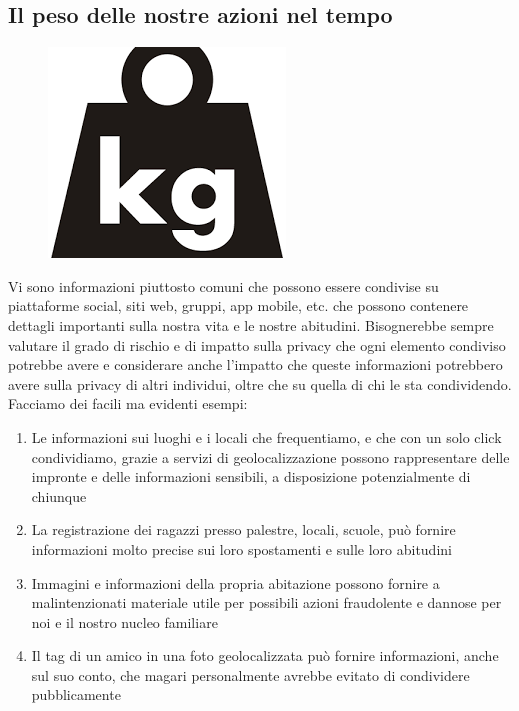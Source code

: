 \documentclass{article}
\begin{document}
	\subsection{Il peso delle nostre azioni nel tempo}
	\begin{figure}[h!]
		\centering
		\includegraphics[scale=0.2]{Image2.png}
	\end{figure}
	Vi sono informazioni piuttosto comuni che possono essere condivise su piattaforme social, siti web, gruppi, app mobile, etc. che possono contenere dettagli importanti sulla nostra vita e le nostre abitudini. Bisognerebbe sempre valutare il grado di rischio e di impatto sulla privacy che ogni elemento condiviso potrebbe avere e considerare anche l’impatto che queste informazioni potrebbero avere sulla privacy di altri individui, oltre che su quella di chi le sta condividendo. 
	Facciamo dei facili ma evidenti esempi:
	\begin{enumerate}
		\item Le informazioni sui luoghi e i locali che frequentiamo, e che con un solo click condividiamo, grazie a servizi di geolocalizzazione possono rappresentare delle impronte e delle informazioni sensibili, a disposizione potenzialmente di chiunque
		\item La registrazione dei ragazzi presso palestre, locali, scuole, può fornire informazioni molto precise sui loro spostamenti e sulle loro abitudini
		\item Immagini e informazioni della propria abitazione possono fornire a malintenzionati materiale utile per possibili azioni fraudolente e dannose per noi e il nostro nucleo familiare
		\item Il tag di un amico in una foto geolocalizzata può fornire informazioni, anche sul suo conto, che magari personalmente avrebbe evitato di condividere pubblicamente
	\end{enumerate}
\end{document}
